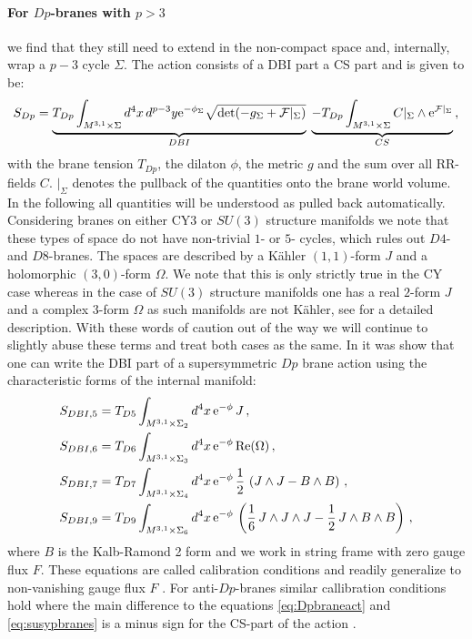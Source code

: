\documentclass[12pt]{report}
\newcommand{\be}{\begin{equation}}
\newcommand{\ee}{\end{equation}}
\newcommand{\bea}{\begin{equation}\begin{aligned}}
\newcommand{\eea}{\end{aligned}\end{equation}}
\def\rme{{\rm e}}
\def\rmre{{\rm Re}}
\begin{document}
\paragraph{For $Dp$-branes with $p>3$} we find that they still need to extend in the non-compact space and, internally, wrap a $p-3$ cycle $\Sigma$. The action consists of a DBI part a CS part and is given to be:
\be 
S_{Dp} = \underbrace{T_{Dp} \int_{M^{3,1}\times \Sigma} d^4x \,d^{p-3}y \rme^{-\phi_\Sigma}\sqrt{\det (-g_\Sigma + \mathcal{F}|_\Sigma)}}_{DBI} \;\underbrace{- T_{Dp} \int_{M^{3,1}\times \Sigma} C|_\Sigma \wedge \rme^{\mathcal{F}|_\Sigma}}_{CS}\,,
\label{eq:Dpbraneact}
\ee
with the brane tension $T_{Dp}$, the dilaton $\phi$, the metric $g$ and the sum over all RR-fields $C$. $|_\Sigma$ denotes the pullback of the quantities onto the brane world volume. In the following all quantities will be understood as pulled back automatically. Considering branes on either CY3 or $SU(3)$ structure manifolds we note that these types of space do not have non-trivial $1$- or $5$- cycles, which rules out $D4$- and $D8$-branes. The spaces are described by a Kähler $(1,1)$-form $J$ and a holomorphic $(3,0)$-form $\Omega$. We note that this is only strictly true in the CY case whereas in the case of $SU(3)$ structure manifolds one has a real $2$-form $J$ and a complex $3$-form $\Omega$ as such manifolds are not Kähler, see \cite{Grana:2005jc} for a detailed description. With these words of caution out of the way we will continue to slightly abuse these terms and treat both cases as the same. In \cite{Blumenhagen:2006ci} it was show that one can write the DBI part of a supersymmetric $Dp$ brane action using the characteristic forms of the internal manifold:
\bea 
S_{DBI,5} &= T_{D5} \int_{M^{3,1}\times \Sigma_2} d^4x \, \rme^{-\phi} \,J\,,\\
S_{DBI,6} &= T_{D6} \int_{M^{3,1}\times \Sigma_3} d^4x \, \rme^{-\phi} \, \rmre(\Omega)\,,\\
S_{DBI,7} &= T_{D7} \int_{M^{3,1}\times \Sigma_4} d^4x \, \rme^{-\phi} \,\frac{1}{2}\,\left(J\wedge J-B\wedge B \right)\,,\\
S_{DBI,9} &= T_{D9} \int_{M^{3,1}\times \Sigma_6} d^4x \, \rme^{-\phi}\, \left(\frac{1}{6} \, J \wedge J \wedge J - \frac{1}{2}\,J \wedge B \wedge B \right)\,,
\label{eq:susypbranes}
\eea
where $B$ is the Kalb-Ramond 2 form and we work in string frame with zero gauge flux $F$. These equations are called calibration conditions and readily generalize to non-vanishing gauge flux $F$ \cite{Martucci:2005ht,Martucci:2006ij,Martucci:2011dn}. For anti-$Dp$-branes similar callibration conditions hold where the main difference to the equations \eqref{eq:Dpbraneact} and \eqref{eq:susypbranes} is a minus sign for the CS-part of the action \cite{Kallosh:2018nrk}.
\end{document}
